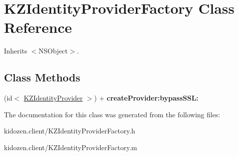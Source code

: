 \hypertarget{interface_k_z_identity_provider_factory}{\section{K\-Z\-Identity\-Provider\-Factory Class Reference}
\label{interface_k_z_identity_provider_factory}
}


Inherits $<$\-N\-S\-Object$>$.

\subsection*{Class Methods}
\begin{DoxyCompactItemize}
\item 
\hypertarget{interface_k_z_identity_provider_factory_a028bb89c6db44600c9bf578c65a213d5}{(id$<$ \hyperlink{protocol_k_z_identity_provider-p}{K\-Z\-Identity\-Provider} $>$) + {\bfseries create\-Provider\-:bypass\-S\-S\-L\-:}}\label{interface_k_z_identity_provider_factory_a028bb89c6db44600c9bf578c65a213d5}

\end{DoxyCompactItemize}


The documentation for this class was generated from the following files\-:\begin{DoxyCompactItemize}
\item 
kidozen.\-client/K\-Z\-Identity\-Provider\-Factory.\-h\item 
kidozen.\-client/K\-Z\-Identity\-Provider\-Factory.\-m\end{DoxyCompactItemize}
